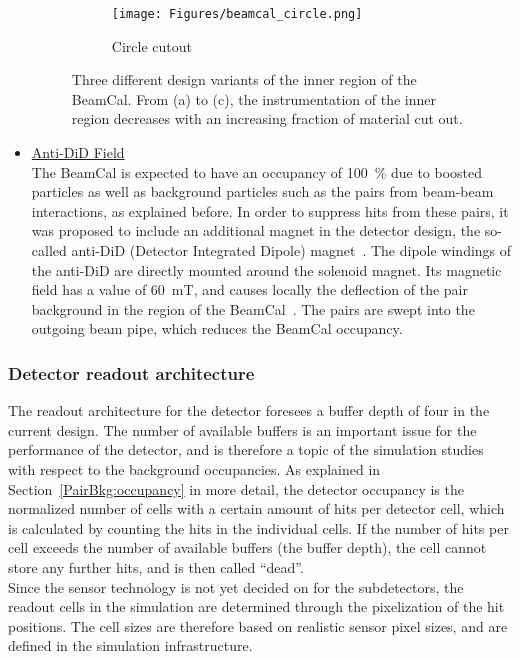 \begin{itemize}
\begin{figure}
\begin{subfigure}[b]{0.3\textwidth}
   \centering
    \texttt{[image: Figures/beamcal\_circle.png]}
   \caption{Circle cutout}
   \end{subfigure}
   \caption[Design variants of the \sid BeamCal]{Three different design variants of the inner region of the \sid BeamCal.
   From (a) to (c), the instrumentation of the inner region decreases with an increasing fraction of material cut out.}
   \label{fig:BeamCal}
 \end{figure}
 \item \underline{Anti-DiD Field}\\
 The BeamCal is expected to have an occupancy of \SI{100}{\percent} due to boosted particles as well as background particles such as the \positron\electron pairs from beam-beam interactions, as explained before.
 In order to suppress hits from these \positron\electron pairs, it was proposed to include an additional magnet in the detector design, the so-called anti-DiD (Detector Integrated Dipole) magnet~\cite{antiDiD}.
 The dipole windings of the anti-DiD are directly mounted around the \sid solenoid magnet.
 Its magnetic field has a value of \SI{60}{\milli\tesla}, and causes locally the deflection of the pair background in the region of the BeamCal~\cite[p. 118]{TDR4}.
 The pairs are swept into the outgoing beam pipe, which reduces the BeamCal occupancy.
\end{itemize}

\subsubsection{Detector readout architecture}
\label{ILC:SiD:readout}
The readout architecture for the \sid detector foresees a buffer depth of four in the current design.
The number of available buffers is an important issue for the performance of the detector, and is therefore a topic of the \sid simulation studies with respect to the background occupancies.
As explained in Section~\ref{PairBkg:occupancy} in more detail, the detector occupancy is the  normalized number of cells with a certain amount of hits per detector cell, which is calculated by counting the hits in the individual cells.
If the number of hits per cell exceeds the number of available buffers (the buffer depth), the cell cannot store any further hits, and is then called ``dead''.
\\Since the sensor technology is not yet decided on for the \sid subdetectors, the readout cells in the simulation are determined through the pixelization of the hit positions.
The cell sizes are therefore based on realistic sensor pixel sizes, and are defined in the \sid simulation infrastructure.

